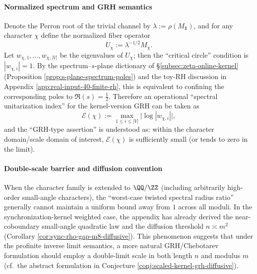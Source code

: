 \paragraph{Normalized spectrum and GRH semantics}
Denote the Perron root of the trivial channel by \(\lambda:=\rho(M_{\mathbf{1}})\), and for any character \(\chi\) define the normalized fiber operator
\[
U_\chi:=\lambda^{-1/2}M_\chi.
\]
Let \(w_{\chi,1},\dots,w_{\chi,|V|}\) be the eigenvalues of \(U_\chi\); then the ``critical circle'' condition is \(|w_{\chi,i}|=1\).
By the spectrum--\(s\)-plane dictionary of \S\ref{subsec:zeta-online-kernel} (Proposition \ref{prop:s-plane-spectrum-poles}) and the toy-RH discussion in Appendix \ref{app:real-input-40-finite-rh}, this is equivalent to confining the corresponding poles to \(\Re(s)=\tfrac12\).
Therefore an operational ``spectral unitarization index'' for the kernel-version GRH can be taken as
\[
\mathcal{E}(\chi):=\max_{1\le i\le |V|}\bigl|\log|w_{\chi,i}|\bigr|,
\]
and the ``GRH-type assertion'' is understood as: within the character domain/scale domain of interest, \(\mathcal{E}(\chi)\) is sufficiently small (or tends to zero in the limit).
\paragraph{Double-scale barrier and diffusion convention}
When the character family is extended to \(\QQ/\ZZ\) (including arbitrarily high-order small-angle characters), the ``worst-case twisted spectral radius ratio'' generally cannot maintain a uniform bound away from \(1\) across all moduli.
In the synchronization-kernel weighted case, the appendix has already derived the near-coboundary small-angle quadratic law and the diffusion threshold \(n\asymp m^2\) (Corollary \ref{cor:sync-rho-gap-m8-diffusive}).
This phenomenon suggests that under the profinite inverse limit semantics, a more natural GRH/Chebotarev formulation should employ a double-limit scale in both length \(n\) and modulus \(m\) (cf.\ the abstract formulation in Conjecture \ref{conj:scaled-kernel-grh-diffusive}).


